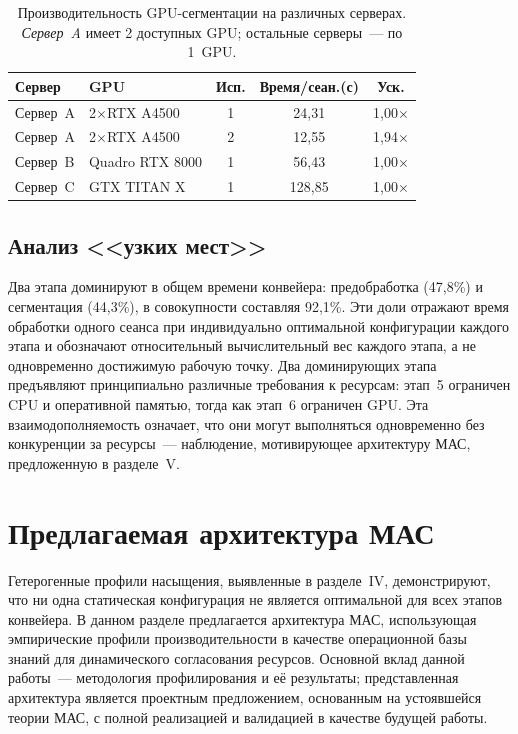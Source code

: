 \documentclass[conference]{IEEEtran}
\begin{document}
\begin{table}[t]
\centering
\caption{Производительность GPU-сегментации на различных серверах. \textit{Сервер~A} имеет 2 доступных GPU; остальные серверы~--- по 1~GPU.}
\label{tab:gpu}
\begin{tabular}{llccc}
\toprule
Сервер & GPU & Исп. & Время/сеан.(с) & Уск. \\
\midrule
Сервер~A & 2$\times$RTX A4500 & 1 & 24,31 & 1,00$\times$ \\
Сервер~A & 2$\times$RTX A4500 & 2 & 12,55 & 1,94$\times$ \\
Сервер~B & Quadro RTX 8000 & 1 & 56,43 & 1,00$\times$ \\
Сервер~C & GTX TITAN X & 1 & 128,85 & 1,00$\times$ \\
\bottomrule
\end{tabular}
\end{table}

\subsection{Анализ <<узких мест>>}

Два этапа доминируют в общем времени конвейера: предобработка (47,8\%) и сегментация (44,3\%), в совокупности составляя 92,1\%. Эти доли отражают время обработки одного сеанса при индивидуально оптимальной конфигурации каждого этапа и обозначают относительный вычислительный вес каждого этапа, а не одновременно достижимую рабочую точку. Два доминирующих этапа предъявляют принципиально различные требования к ресурсам: этап~5 ограничен CPU и оперативной памятью, тогда как этап~6 ограничен GPU. Эта взаимодополняемость означает, что они могут выполняться одновременно без конкуренции за ресурсы~--- наблюдение, мотивирующее архитектуру МАС, предложенную в разделе~V.

\section{Предлагаемая архитектура МАС}

Гетерогенные профили насыщения, выявленные в разделе~IV, демонстрируют, что ни одна статическая конфигурация не является оптимальной для всех этапов конвейера. В данном разделе предлагается архитектура МАС, использующая эмпирические профили производительности в качестве операционной базы знаний для динамического согласования ресурсов. Основной вклад данной работы~--- методология профилирования и её результаты; представленная архитектура является проектным предложением, основанным на устоявшейся теории МАС, с полной реализацией и валидацией в качестве будущей работы.
\end{document}
